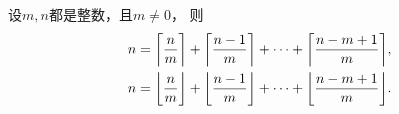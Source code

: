 \begin{theorem}
设\(m,n\)都是整数，且\(m\neq0\)，
则\begin{gather}
	n = \ceil*{\frac{n\vphantom{1}}{m}}
	+ \ceil*{\frac{n-1}{m}}
	+ \dotsb
	+ \ceil*{\frac{n-m+1}{m}}, \\
	n = \floor*{\frac{n\vphantom{1}}{m}}
	+ \floor*{\frac{n-1}{m}}
	+ \dotsb
	+ \floor*{\frac{n-m+1}{m}}.
\end{gather}
\end{theorem}

